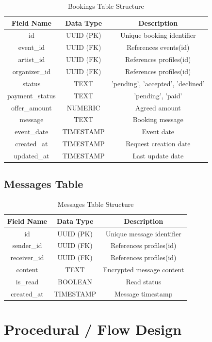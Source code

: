 \documentclass[12pt,a4paper]{report}
\begin{document}
\begin{table}[H]
\centering
\caption{Bookings Table Structure}
\begin{tabular}{|c|c|c|}
\hline
\textbf{Field Name} & \textbf{Data Type} & \textbf{Description} \\
\hline
id & UUID (PK) & Unique booking identifier \\
event\_id & UUID (FK) & References events(id) \\
artist\_id & UUID (FK) & References profiles(id) \\
organizer\_id & UUID (FK) & References profiles(id) \\
status & TEXT & 'pending', 'accepted', 'declined' \\
payment\_status & TEXT & 'pending', 'paid' \\
offer\_amount & NUMERIC & Agreed amount \\
message & TEXT & Booking message \\
event\_date & TIMESTAMP & Event date \\
created\_at & TIMESTAMP & Request creation date \\
updated\_at & TIMESTAMP & Last update date \\
\hline
\end{tabular}
\end{table}

\subsection*{Messages Table}

\begin{table}[H]
\centering
\caption{Messages Table Structure}
\begin{tabular}{|c|c|c|}
\hline
\textbf{Field Name} & \textbf{Data Type} & \textbf{Description} \\
\hline
id & UUID (PK) & Unique message identifier \\
sender\_id & UUID (FK) & References profiles(id) \\
receiver\_id & UUID (FK) & References profiles(id) \\
content & TEXT & Encrypted message content \\
is\_read & BOOLEAN & Read status \\
created\_at & TIMESTAMP & Message timestamp \\
\hline
\end{tabular}
\end{table}

\section{Procedural / Flow Design}
\end{document}
